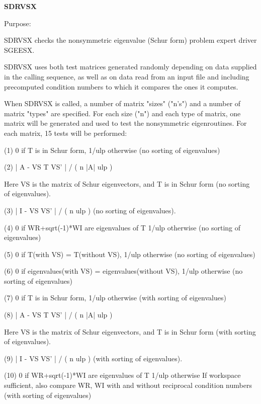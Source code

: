 {\bfseries S\+D\+R\+V\+S\+X} 

\begin{DoxyParagraph}{Purpose\+: }
\begin{DoxyVerb}    SDRVSX checks the nonsymmetric eigenvalue (Schur form) problem
    expert driver SGEESX.

    SDRVSX uses both test matrices generated randomly depending on
    data supplied in the calling sequence, as well as on data
    read from an input file and including precomputed condition
    numbers to which it compares the ones it computes.

    When SDRVSX is called, a number of matrix "sizes" ("n's") and a
    number of matrix "types" are specified.  For each size ("n")
    and each type of matrix, one matrix will be generated and used
    to test the nonsymmetric eigenroutines.  For each matrix, 15
    tests will be performed:

    (1)     0 if T is in Schur form, 1/ulp otherwise
           (no sorting of eigenvalues)

    (2)     | A - VS T VS' | / ( n |A| ulp )

      Here VS is the matrix of Schur eigenvectors, and T is in Schur
      form  (no sorting of eigenvalues).

    (3)     | I - VS VS' | / ( n ulp ) (no sorting of eigenvalues).

    (4)     0     if WR+sqrt(-1)*WI are eigenvalues of T
            1/ulp otherwise
            (no sorting of eigenvalues)

    (5)     0     if T(with VS) = T(without VS),
            1/ulp otherwise
            (no sorting of eigenvalues)

    (6)     0     if eigenvalues(with VS) = eigenvalues(without VS),
            1/ulp otherwise
            (no sorting of eigenvalues)

    (7)     0 if T is in Schur form, 1/ulp otherwise
            (with sorting of eigenvalues)

    (8)     | A - VS T VS' | / ( n |A| ulp )

      Here VS is the matrix of Schur eigenvectors, and T is in Schur
      form  (with sorting of eigenvalues).

    (9)     | I - VS VS' | / ( n ulp ) (with sorting of eigenvalues).

    (10)    0     if WR+sqrt(-1)*WI are eigenvalues of T
            1/ulp otherwise
            If workspace sufficient, also compare WR, WI with and
            without reciprocal condition numbers
            (with sorting of eigenvalues)


\end{DoxyVerb}
\end{DoxyParagraph}

